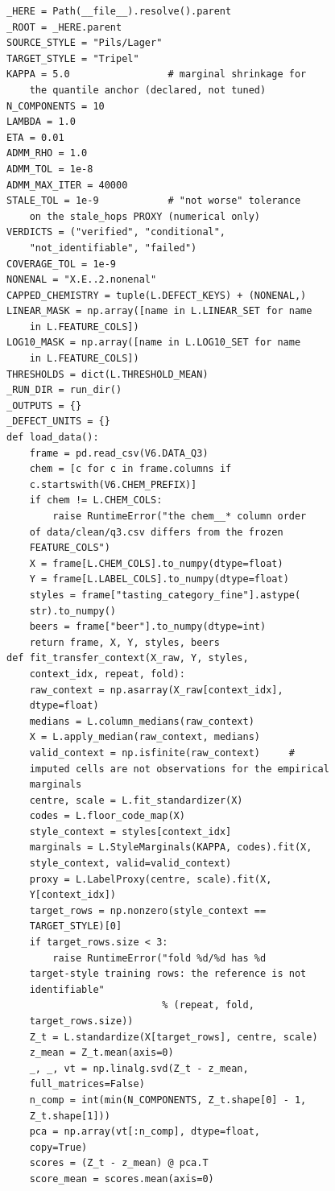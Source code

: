\begin{multicols}{2}
\begin{Verbatim}[fontsize=\scriptsize]
_HERE = Path(__file__).resolve().parent
_ROOT = _HERE.parent
SOURCE_STYLE = "Pils/Lager"
TARGET_STYLE = "Tripel"
KAPPA = 5.0                 # marginal shrinkage for
    the quantile anchor (declared, not tuned)
N_COMPONENTS = 10
LAMBDA = 1.0
ETA = 0.01
ADMM_RHO = 1.0
ADMM_TOL = 1e-8
ADMM_MAX_ITER = 40000
STALE_TOL = 1e-9            # "not worse" tolerance
    on the stale_hops PROXY (numerical only)
VERDICTS = ("verified", "conditional",
    "not_identifiable", "failed")
COVERAGE_TOL = 1e-9
NONENAL = "X.E..2.nonenal"
CAPPED_CHEMISTRY = tuple(L.DEFECT_KEYS) + (NONENAL,)
LINEAR_MASK = np.array([name in L.LINEAR_SET for name
    in L.FEATURE_COLS])
LOG10_MASK = np.array([name in L.LOG10_SET for name
    in L.FEATURE_COLS])
THRESHOLDS = dict(L.THRESHOLD_MEAN)
_RUN_DIR = run_dir()
_OUTPUTS = {}
_DEFECT_UNITS = {}
def load_data():
    frame = pd.read_csv(V6.DATA_Q3)
    chem = [c for c in frame.columns if
    c.startswith(V6.CHEM_PREFIX)]
    if chem != L.CHEM_COLS:
        raise RuntimeError("the chem__* column order
    of data/clean/q3.csv differs from the frozen
    FEATURE_COLS")
    X = frame[L.CHEM_COLS].to_numpy(dtype=float)
    Y = frame[L.LABEL_COLS].to_numpy(dtype=float)
    styles = frame["tasting_category_fine"].astype(
    str).to_numpy()
    beers = frame["beer"].to_numpy(dtype=int)
    return frame, X, Y, styles, beers
def fit_transfer_context(X_raw, Y, styles,
    context_idx, repeat, fold):
    raw_context = np.asarray(X_raw[context_idx],
    dtype=float)
    medians = L.column_medians(raw_context)
    X = L.apply_median(raw_context, medians)
    valid_context = np.isfinite(raw_context)     #
    imputed cells are not observations for the empirical
    marginals
    centre, scale = L.fit_standardizer(X)
    codes = L.floor_code_map(X)
    style_context = styles[context_idx]
    marginals = L.StyleMarginals(KAPPA, codes).fit(X,
    style_context, valid=valid_context)
    proxy = L.LabelProxy(centre, scale).fit(X,
    Y[context_idx])
    target_rows = np.nonzero(style_context ==
    TARGET_STYLE)[0]
    if target_rows.size < 3:
        raise RuntimeError("fold %d/%d has %d
    target-style training rows: the reference is not
    identifiable"
                           % (repeat, fold,
    target_rows.size))
    Z_t = L.standardize(X[target_rows], centre, scale)
    z_mean = Z_t.mean(axis=0)
    _, _, vt = np.linalg.svd(Z_t - z_mean,
    full_matrices=False)
    n_comp = int(min(N_COMPONENTS, Z_t.shape[0] - 1,
    Z_t.shape[1]))
    pca = np.array(vt[:n_comp], dtype=float,
    copy=True)
    scores = (Z_t - z_mean) @ pca.T
    score_mean = scores.mean(axis=0)

\end{Verbatim}
\end{multicols}
